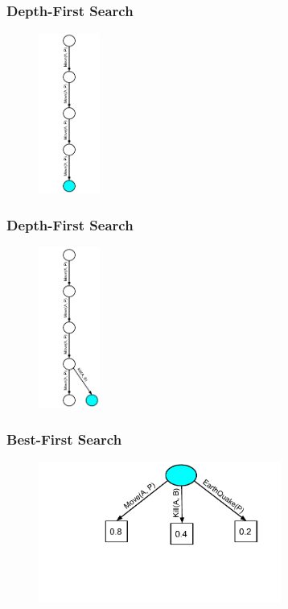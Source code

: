 \documentclass{beamer}
\begin{document}
\begin{frame}[fragile]
\frametitle{Depth-First Search}
\begin{figure}[h]
	\includegraphics[width=2cm]{Diagrams/DepthFirst/DepthFirstFour.pdf}
	\centering
\end{figure}
\end{frame}

\begin{frame}[fragile]
\frametitle{Depth-First Search}
\begin{figure}[h]
	\includegraphics[width=2cm]{Diagrams/DepthFirst/DepthFirstFive.pdf}
	\centering
\end{figure}
\end{frame}



\begin{frame}[fragile]
\frametitle{Best-First Search}
\begin{figure}[h]
	\includegraphics[width=8cm]{Diagrams/BestFirst/BestTreeOne.pdf}
	\centering
\end{figure}
\end{frame}
\end{document}
